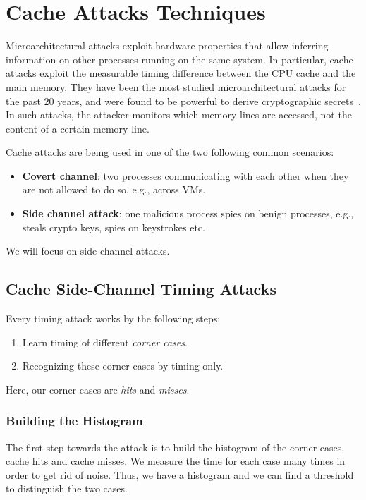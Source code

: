 \section{Cache Attacks Techniques} %
\label{sec:cacheattackstech}

Microarchitectural attacks exploit hardware properties that allow inferring
information on other processes running on the same system. In particular, cache
attacks exploit the measurable timing difference between the CPU cache and the
main memory. They have been the most studied microarchitectural attacks for the
past 20 years, and were found to be powerful to derive cryptographic
secrets~\cite{Percival2009}. In such attacks, the attacker monitors which memory
lines are accessed, not the content of a certain memory line.

\noindent Cache attacks are being used in one of the two following common
scenarios:
\begin{itemize}
\item \textbf{Covert channel}: two processes communicating with each other when
they are not allowed to do so, e.g., across VMs.
\item \textbf{Side channel attack}: one malicious process spies on benign
processes, e.g., steals crypto keys, spies on keystrokes etc. 
\end{itemize}
We will focus on side-channel attacks.

\subsection{Cache Side-Channel Timing Attacks}
\label{subsec:cachesidechanneltiming}
Every timing attack works by the following steps:
\begin{enumerate}
    \item Learn timing of different \textit{corner cases}.
    \item Recognizing these corner cases by timing only.
\end{enumerate}
Here, our corner cases are \textit{hits} and \textit{misses}.

\subsubsection{Building the Histogram}
\label{subsubsec:buildingthehistogram}
The first step towards the attack is to build the histogram of the corner cases,
cache hits and cache misses. We measure the time for each case many times in
order to get rid of noise. Thus, we have a histogram and we can find a threshold
to distinguish the two cases.


